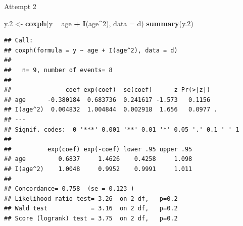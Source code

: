 \documentclass[ignorenonframetext,]{beamer}
\newenvironment{Shaded}{\begin{snugshade}}{\end{snugshade}}
\newcommand{\DataTypeTok}[1]{\textcolor[rgb]{0.13,0.29,0.53}{#1}}
\newcommand{\DecValTok}[1]{\textcolor[rgb]{0.00,0.00,0.81}{#1}}
\newcommand{\FloatTok}[1]{\textcolor[rgb]{0.00,0.00,0.81}{#1}}
\newcommand{\KeywordTok}[1]{\textcolor[rgb]{0.13,0.29,0.53}{\textbf{#1}}}
\newcommand{\NormalTok}[1]{#1}
\newcommand{\OperatorTok}[1]{\textcolor[rgb]{0.81,0.36,0.00}{\textbf{#1}}}
\newcommand{\StringTok}[1]{\textcolor[rgb]{0.31,0.60,0.02}{#1}}
\begin{document}
\begin{frame}[fragile]{Attempt 2}
\protect\hypertarget{attempt-2}{}

\begin{Shaded}
\begin{Highlighting}[]
\NormalTok{y}\FloatTok{.2}\NormalTok{ <-}\StringTok{ }\KeywordTok{coxph}\NormalTok{(y }\OperatorTok{~}\StringTok{ }\NormalTok{age }\OperatorTok{+}\StringTok{ }\KeywordTok{I}\NormalTok{(age}\OperatorTok{^}\DecValTok{2}\NormalTok{), }\DataTypeTok{data =}\NormalTok{ d)}
\KeywordTok{summary}\NormalTok{(y}\FloatTok{.2}\NormalTok{)}
\end{Highlighting}
\end{Shaded}

\begin{verbatim}
## Call:
## coxph(formula = y ~ age + I(age^2), data = d)
## 
##   n= 9, number of events= 8 
## 
##               coef exp(coef)  se(coef)      z Pr(>|z|)  
## age      -0.380184  0.683736  0.241617 -1.573   0.1156  
## I(age^2)  0.004832  1.004844  0.002918  1.656   0.0977 .
## ---
## Signif. codes:  0 '***' 0.001 '**' 0.01 '*' 0.05 '.' 0.1 ' ' 1
## 
##          exp(coef) exp(-coef) lower .95 upper .95
## age         0.6837     1.4626    0.4258     1.098
## I(age^2)    1.0048     0.9952    0.9991     1.011
## 
## Concordance= 0.758  (se = 0.123 )
## Likelihood ratio test= 3.26  on 2 df,   p=0.2
## Wald test            = 3.16  on 2 df,   p=0.2
## Score (logrank) test = 3.75  on 2 df,   p=0.2
\end{verbatim}

\end{frame}
\end{document}
